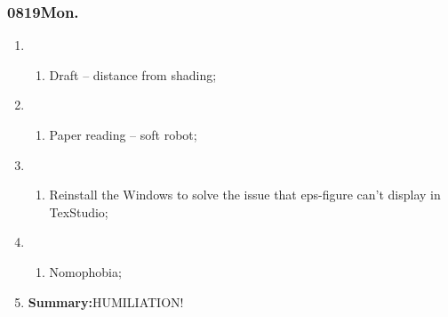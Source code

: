 \subsubsection{0819Mon.}
\begin{enumerate}
	\item \ncquaone
	\begin{enumerate}[(1)]
		\item Draft -- distance from shading;\rightundoneBlack
	\end{enumerate}
	
	\item \ncquatwo	
	\begin{enumerate}[(1)]
		\item Paper reading -- soft robot;\rightundoneBlack
	\end{enumerate}
	
	\item \ncquathree
	\begin{enumerate}[(1)]
		\item Reinstall the Windows to solve the issue that eps-figure can't display in TexStudio;\rightdone
	\end{enumerate}
	
	\item \ncquafour	
	\begin{enumerate}[(1)]
		\item Nomophobia;\rightundoneBlack
	\end{enumerate}
	\item \textbf{Summary:}HUMILIATION! 
\end{enumerate}
